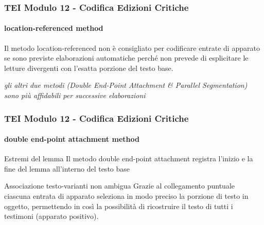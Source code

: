 \begin{frame}
    \frametitle{TEI Modulo 12 - Codifica Edizioni Critiche}
    \framesubtitle{location-referenced method}
    \addtocounter{nframe}{1}
    


    \begin{block}
       Il metodo location-referenced non è consigliato per codificare entrate di apparato se sono previste elaborazioni automatiche perché non prevede di esplicitare le letture divergenti con l'esatta porzione del testo base.
    \end{block}

    \begin{center}
        \textit{gli altri due metodi (Double End-Point Attachment & Parallel Segmentation) sono più affidabili per successive elaborazioni}
    \end{center}
    
\end{frame}



\begin{frame}
    \frametitle{TEI Modulo 12 - Codifica Edizioni Critiche}
    \framesubtitle{double end-point attachment method}
    \addtocounter{nframe}{1}
    



    \begin{block}{Estremi del lemma}
      Il metodo double end-point attachment registra l'inizio e la fine del lemma all'interno del testo base
    \end{block}
    
    \begin{block}{Associazione testo-varianti non ambigua}
        Grazie al collegamento puntuale ciascuna entrata di apparato seleziona in modo preciso la porzione di testo in oggetto, permettendo in così la possibilità di ricostruire il testo di tutti i testimoni (apparato positivo).
    \end{block}

\end{frame}




